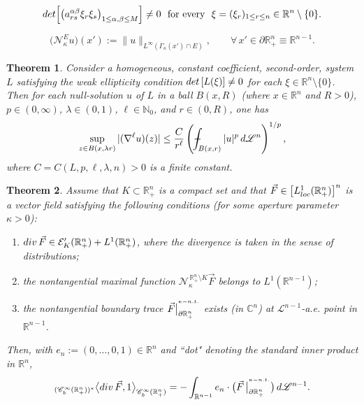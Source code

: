 \documentclass[10pt,a4paper]{amsart}
\newtheorem{theorem}{Theorem}
\def\XXint#1#2#3{{\setbox0=\hbox{$#1{#2#3}{\int}$}
     \vcenter{\hbox{$#2#3$}}\kern-.5\wd0}}
\def\Xint#1{\mathchoice
   {\XXint\displaystyle\textstyle{#1}}%
   {\XXint\textstyle\scriptstyle{#1}}%
   {\XXint\scriptstyle\scriptscriptstyle{#1}}%
   {\XXint\scriptscriptstyle\scriptscriptstyle{#1}}%
   \!\int}
\def\aver#1{\Xint-_{#1}}
\begin{document}
\begin{equation}\label{Def-ELLa.INTR}
{\rm det}\Big[\big(a^{\alpha\beta}_{rs}\xi_r\xi_s\big)_{1\leq\alpha,\beta\leq M}\Big]\not=0
\,\,\text{ for every }\,\,\xi=(\xi_r)_{1\leq r\leq n}\in{\mathbb{R}}^n\setminus\{0\}.
\end{equation}

\begin{equation}\label{NT-Fct.23}
\big({\mathcal{N}}^E_\kappa u\big)(x'):=\|u\|_{L^\infty(\Gamma_\kappa(x')\cap E)},\qquad
\forall\,x'\in\partial{\mathbb{R}}^{n}_{+}\equiv{\mathbb{R}}^{n-1}.
\end{equation}

\begin{theorem}\label{ker-sbav}
Consider a homogeneous, constant coefficient, second-order, system $L$ satisfying the weak 
ellipticity condition ${\rm det}\,[L(\xi)]\not=0$ for each $\xi\in{\mathbb{R}}^n\setminus\{0\}$.
Then for each null-solution $u$ of $L$ in a ball $B(x,R)$ {\rm (}where $x\in{\mathbb{R}}^n$ and $R>0${\rm )}, 
$p\in(0,\infty)$, $\lambda\in(0,1)$, $\ell\in{\mathbb{N}}_0$, and $r\in(0,R)$, one has
%
\begin{equation}\label{detraz}
\sup_{z\in B(x,\lambda r)}|(\nabla^\ell u)(z)|
\leq\frac{C}{r^\ell}\left(\aver{B(x,r)}|u|^p\,d{\mathscr{L}}^n\right)^{1/p},
\end{equation}
%
where $C=C(L,p,\ell,\lambda,n)>0$ is a finite constant.
\end{theorem}

\begin{theorem}\label{theor:div-thm}
Assume that $K\subset{\mathbb{R}}^n_{+}$ is a compact set and that
$\vec{F}\in\big[L^1_{\rm loc}({\mathbb{R}}^n_{+})\big]^n$ is a vector
field satisfying the following conditions {\rm (}for some aperture parameter $\kappa>0${\rm )}:
%
\begin{enumerate}\itemsep=0.2cm
%
\item [(a)] ${\rm div}\,\vec{F}\in\mathcal{E}'_K({\mathbb{R}}^n_{+})+L^1({\mathbb{R}}^n_{+})$,
where the divergence is taken in the sense of distributions;
%
\item[(b)] the nontangential maximal function ${\mathcal{N}}_\kappa^{\,{\mathbb{R}}^n_{+}\setminus K}\vec{F}$ 
belongs to $L^1({\mathbb{R}}^{n-1})$;
%
\item [(c)] the nontangential boundary trace 
$\vec{F}\big|_{\partial{\mathbb{R}}^n_{+}}^{{}^{\kappa-{\rm n.t.}}}$ exists 
{\rm (}in ${\mathbb{C}}^n${\rm )} at ${\mathscr{L}}^{n-1}$-a.e. point in ${\mathbb{R}}^{n-1}$.
\end{enumerate}

\noindent Then, with $e_n:=(0,\dots,0,1)\in{\mathbb{R}}^n$ and ``dot" denoting the
standard inner product in ${\mathbb{R}}^n$,
%
\begin{equation}\label{eqn:div-form}
{}_{(\mathscr{C}_b^\infty({\mathbb{R}}^n_{+}))^\ast}\big\langle{\rm div}\,\vec{F},1
\big\rangle_{\mathscr{C}_b^\infty({\mathbb{R}}^n_{+})}
=-\int_{{\mathbb{R}}^{n-1}}e_n\cdot
\big(\vec F\,\big|^{{}^{\kappa-{\rm n.t.}}}_{\partial{\mathbb{R}}^n_{+}}\bigr)\,d{\mathscr{L}}^{n-1}.
\end{equation}
\end{theorem}
\end{document}
